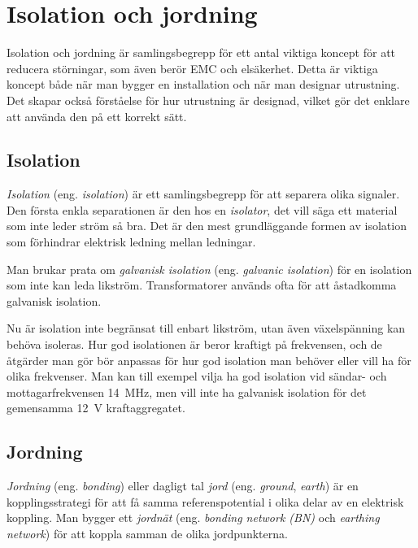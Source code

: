 \chapter[Isolation och jord]{Isolation och jordning}

\noindent Isolation och jordning är samlingsbegrepp för ett antal viktiga koncept för
att reducera störningar, som även berör EMC och elsäkerhet.
Detta är viktiga koncept både när man bygger en installation och när man
designar utrustning.
Det skapar också förståelse för hur utrustning är designad, vilket gör det
enklare att använda den på ett korrekt sätt.

\section{Isolation}

\emph{Isolation} (eng. \emph{isolation}) är ett samlingsbegrepp för att separera
olika signaler.
Den första enkla separationen är den hos en \emph{isolator}, det vill säga ett
material som inte leder ström så bra.
Det är den mest grundläggande formen av isolation som förhindrar elektrisk
ledning mellan ledningar.

Man brukar prata om \emph{galvanisk isolation} (eng. \emph{galvanic isolation})
för en isolation som inte kan leda likström.
Transformatorer används ofta för att åstadkomma galvanisk isolation.

Nu är isolation inte begränsat till enbart likström, utan även växelspänning
kan behöva isoleras.
Hur god isolationen är beror kraftigt på frekvensen, och de åtgärder man gör
bör anpassas för hur god isolation man behöver eller vill ha för olika
frekvenser.
Man kan till exempel vilja ha god isolation vid sändar- och mottagarfrekvensen
\qty{14}{\mega\hertz}, men vill inte ha galvanisk isolation för det gemensamma
\qty{12}{\volt} kraftaggregatet.

\section{Jordning}

\emph{Jordning} (eng. \emph{bonding}) eller dagligt tal \emph{jord} (eng.
\emph{ground}, \emph{earth}) är en kopplingsstrategi för att få samma
referenspotential i olika delar av en elektrisk koppling.
Man bygger ett \emph{jordnät} (eng. \emph{bonding network (BN)}
\cite[kap 3.2.1]{K27-1991} och \emph{earthing network})
\cite[kap 3.1.3]{K27-1991} för att koppla samman de olika jordpunkterna.

